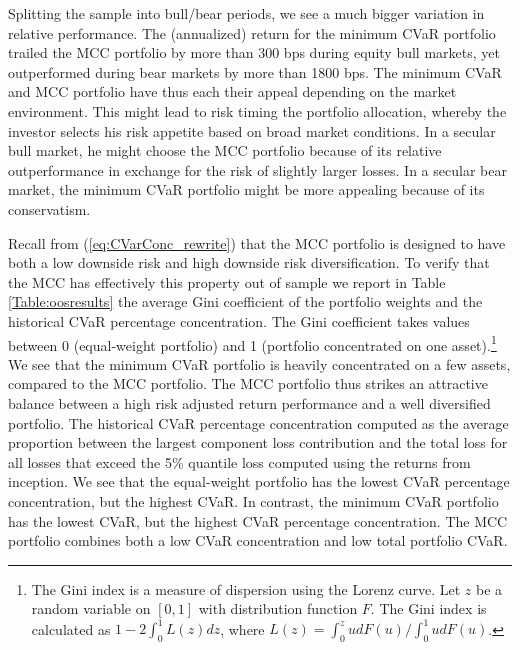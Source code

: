 \documentclass[12pt,a4paper]{article}
\begin{document}
Splitting the sample into bull/bear periods, we see a much bigger variation in relative performance. The (annualized) return for the minimum CVaR portfolio trailed the MCC portfolio by more than 300 bps during equity bull markets, yet outperformed during bear markets by more than 1800 bps. The minimum CVaR and MCC portfolio have thus each their appeal depending on the market environment. This might lead to risk timing the portfolio allocation, whereby the investor selects his risk appetite based on broad market conditions. In a secular bull market, he might choose the MCC portfolio because of its relative outperformance in exchange for the risk of slightly larger losses. In a secular bear market, the minimum CVaR portfolio might be more appealing because of its conservatism. %

Recall from (\ref{eq:CVarConc_rewrite}) that the MCC portfolio is designed to have both a low downside risk and high downside risk diversification. To verify that the MCC has effectively this property out of sample we report in Table  \ref{Table:oosresults} the average Gini coefficient of the portfolio weights and the historical CVaR percentage concentration. The Gini coefficient takes values between 0 (equal-weight portfolio) and 1 (portfolio concentrated on one asset).\footnote{The Gini index is a measure of dispersion using the Lorenz curve. Let $z$ be a random variable
on $[0,1]$ with distribution function $F$. The Gini index is calculated as $1-2\int_{0}^1 L(z)dz$, where $L(z)=\int_{0}^{z} udF(u)/\int_{0}^1 udF(u)$. } We see that the minimum CVaR portfolio is heavily concentrated on a few assets, compared to the MCC portfolio. The MCC portfolio thus strikes an attractive balance between a high risk adjusted return performance and a well diversified portfolio. The historical CVaR percentage concentration computed as the average proportion between the largest component loss contribution and the total loss for all losses that exceed the 5\% quantile loss computed using the returns from inception. We see that the equal-weight portfolio has the lowest CVaR percentage concentration, but the highest CVaR. In contrast, the minimum CVaR portfolio has the lowest CVaR, but the highest CVaR percentage concentration. The MCC portfolio combines both a low CVaR concentration and low total portfolio CVaR.
\end{document}
